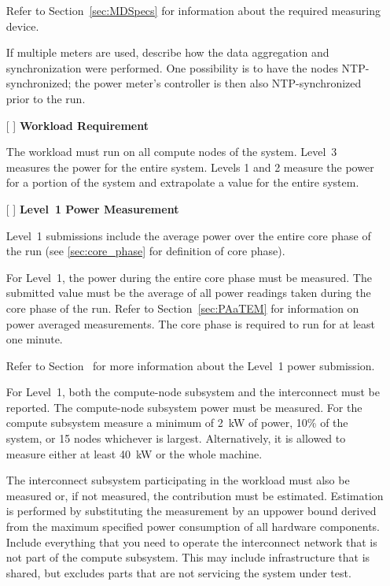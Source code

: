\begin{itemize}
Refer to Section~\ref{sec:MDSpecs} for information about the required measuring device.

If multiple meters are used, describe how the data aggregation and synchronization were performed. One possibility is to have the nodes NTP-synchronized; the power meter's controller is then also NTP-synchronized prior to the run.

\item[{[ ]}]
\textbf{Workload Requirement}

The workload must run on all compute nodes of the system. Level~3 measures the power for the entire system. Levels 1 and 2 measure the power for a portion of the system and extrapolate a value for the entire system. 

\item[{[ ]}]
\textbf{Level~1 Power Measurement}

Level~1 submissions include the average power over the entire core phase of the run (see \ref{sec:core_phase} for definition of core phase).

For Level~1, the power during the entire core phase must be measured.
The submitted value must be the average of all power readings taken during the core phase of the run.
Refer to Section~\ref{sec:PAaTEM} for information on power averaged measurements.
The core phase is required to run for at least one minute.

Refer to Section~ for more information about the Level~1 power submission.

For Level~1, both the compute-node subsystem and the interconnect must be reported.  
The compute-node subsystem power must be measured. 
For the compute subsystem measure a minimum of 2~kW of power, 10\% of the system, or 15 nodes whichever is largest.
Alternatively, it is allowed to measure either at least 40~kW or the whole machine.

The interconnect subsystem participating in the workload must also be measured or, if not measured, the contribution must be estimated.
Estimation is performed by substituting the measurement by an uppower bound derived from the maximum specified power consumption of all hardware components.
Include everything that you need to operate the interconnect network that is not part of the compute subsystem. 
This may include infrastructure that is shared, but excludes parts that are not servicing the system under test.


\end{itemize}
